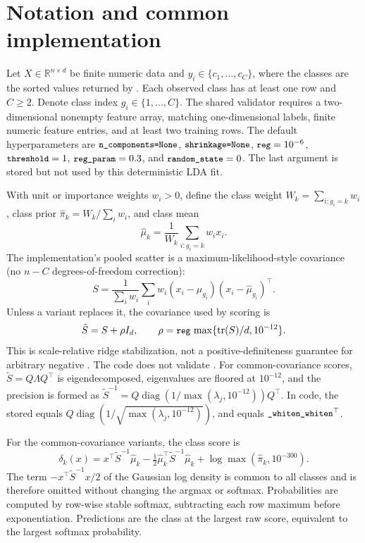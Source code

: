 \documentclass[conference]{IEEEtran}
\begin{document}
\section{Notation and common implementation}
Let \(X\in\mathbb R^{n\times d}\) be finite numeric data and \(y_i\in\{c_1,\ldots,c_C\}\), where the classes are the sorted values returned by . Each observed class has at least one row and \(C\geq2\). Denote class index \(g_i\in\{1,\ldots,C\}\). The shared validator requires a two-dimensional nonempty feature array, matching one-dimensional labels, finite numeric feature entries, and at least two training rows. The default hyperparameters are \(\texttt{\small n\_components=None}\), \(\texttt{\small shrinkage=None}\), \(\texttt{\small reg}=10^{-6}\), \(\texttt{\small threshold}=1\), \(\texttt{\small reg\_param}=0.3\), and \(\texttt{\small random\_state}=0\). The last argument is stored but not used by this deterministic LDA fit.

With unit or importance weights \(w_i>0\), define the class weight \(W_k=\sum_{i:g_i=k}w_i\), class prior \(\hat\pi_k=W_k/\sum_iw_i\), and class mean
\begin{equation}
\hat\mu_k=\frac{1}{W_k}\sum_{i:g_i=k}w_i x_i.
\end{equation}
The implementation's pooled scatter is a maximum-likelihood-style covariance (no \(n-C\) degrees-of-freedom correction):
\begin{equation}
S=\frac{1}{\sum_i w_i}\sum_i w_i(x_i-\hat\mu_{g_i})(x_i-\hat\mu_{g_i})^\top.
\label{eq:pooled}
\end{equation}
Unless a variant replaces it, the covariance used by scoring is
\begin{equation}
\tilde S=S+\rho I_d,\qquad \rho=\texttt{\small reg}\,\max\{\operatorname{tr}(S)/d,10^{-12}\}.
\label{eq:jitter}
\end{equation}
This is scale-relative ridge stabilization, not a positive-definiteness guarantee for arbitrary negative . The code does not validate . For common-covariance scores, \(\tilde S=Q\Lambda Q^\top\) is eigendecomposed, eigenvalues are floored at \(10^{-12}\), and the precision is formed as \(\tilde S^{-1}=Q\operatorname{diag}(1/\max(\lambda_j,10^{-12}))Q^\top\). In code, the stored  equals \(Q\operatorname{diag}(1/\sqrt{\max(\lambda_j,10^{-12})})\), and  equals \(\texttt{\small \_whiten}\texttt{\small \_whiten}^{\top}\).

For the common-covariance variants, the class score is
\begin{equation}
\delta_k(x)=x^\top\tilde S^{-1}\hat\mu_k-\tfrac12\hat\mu_k^\top\tilde S^{-1}\hat\mu_k+\log\max(\hat\pi_k,10^{-300}).
\label{eq:lda-score}
\end{equation}
The term \(-x^\top\tilde S^{-1}x/2\) of the Gaussian log density is common to all classes and is therefore omitted without changing the argmax or softmax. Probabilities are computed by row-wise stable softmax, subtracting each row maximum before exponentiation. Predictions are the class at the largest raw score, equivalent to the largest softmax probability.
\end{document}
